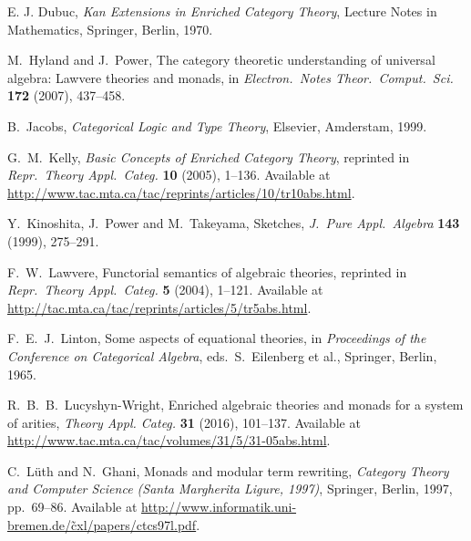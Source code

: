 \documentclass{amsart}
\theoremstyle{definition}
\begin{document}
\begin{thebibliography}{100}
 E. J. Dubuc, \textsl{Kan Extensions in Enriched Category Theory}, Lecture Notes in Mathematics, Springer, Berlin, 1970.


 M.\ Hyland and J.\ Power, The category theoretic understanding of 
universal algebra: Lawvere theories and monads, in \textsl{Electron.\ Notes Theor.\ Comput.\ Sci.} \textbf{172} (2007), 437--458.

 B.\ Jacobs, \textsl{Categorical Logic and Type Theory}, Elsevier, Amderstam, 1999.
	
 G.\ M.\ Kelly, \textsl{Basic Concepts of Enriched Category Theory}, reprinted in \textsl{Repr.\ Theory Appl.\ Categ.} \textbf{10} (2005), 1--136.  Available at \href{http://www.tac.mta.ca/tac/reprints/articles/10/tr10abs.html}{http://www.tac.mta.ca/tac/reprints/articles/10/tr10abs.html}.

 Y.\ Kinoshita, J.\ Power and M.\ Takeyama, Sketches,
\textsl{J.\ Pure Appl.\ Algebra} \textbf{143} (1999), 275--291.

 F.\ W.\ Lawvere, Functorial semantics of algebraic theories, reprinted in
\textsl{Repr.\ Theory Appl.\ Categ.} \textbf{5} (2004), 1--121.  Available at \href{http://tac.mta.ca/tac/reprints/articles/5/tr5abs.html}{http://tac.mta.ca/tac/reprints/articles/5/tr5abs.html}.

 F.\ E.\ J.\ Linton, Some aspects of equational theories, in 
\textsl{Proceedings of the Conference on Categorical Algebra}, eds.\ S.\ Eilenberg et al.,
Springer, Berlin, 1965.

 R.\ B.\ B.\ Lucyshyn-Wright, Enriched algebraic theories and monads for a system of arities, \textsl{Theory Appl. Categ.} \textbf{31} (2016), 101--137.  Available at \href{http://www.tac.mta.ca/tac/volumes/31/5/31-05abs.html}{http://www.tac.mta.ca/tac/volumes/31/5/31-05abs.html}.
	
 C.\ L\"{u}th and N.\ Ghani, Monads and modular term rewriting,
\textsl{Category Theory and Computer Science ({S}anta {M}argherita Ligure, 1997)}, Springer, Berlin, 1997, pp.\ 69--86.  Available at \href{http://www.informatik.uni-bremen.de/~cxl/papers/ctcs97l.pdf}{http://www.informatik.uni-bremen.de/\~cxl/papers/ctcs97l.pdf}.



\end{thebibliography}
\end{document}
